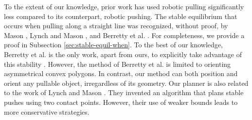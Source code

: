 \documentclass[conference]{IEEEtran}
\begin{document}
To the extent of our knowledge, prior work has used robotic pulling
significantly less compared to its counterpart, robotic pushing. The
stable equilibrium that occurs when pulling along a straight line was
recognized, without proof, by Mason \cite{mason1986}, Lynch and Mason
\cite{lynch1995pulling}, and Berretty et al.
\cite{berretty2001orienting}. For completeness, we provide a proof in
Subsection \ref{sec:stable-equil-when}. To the best of our knowledge,
Berretty et al. is the only work, apart from ours, to explicitly take
advantage of this stability \cite{berretty2001orienting}. However, the
method of Berretty et al. is limited to orienting asymmetrical convex
polygons. In contrast, our method can both position and orient any
pullable object, irregardless of its geometry.
Our planner is also related to the work of Lynch and Mason
\cite{lynch1996stable}. They invented an algorithm that plans stable
pushes using two contact points. However, their use of weaker bounds
\cite{peshkin1988motion, alexander1993bounds, Mason} leads to more
conservative strategies.





\end{document}
